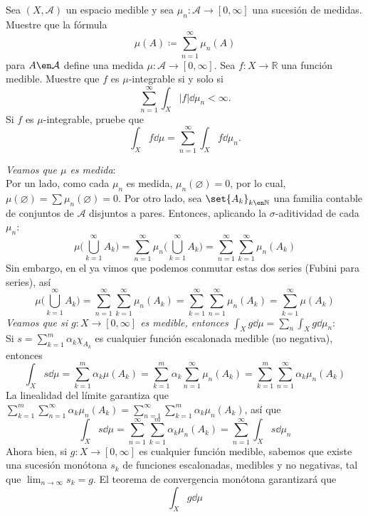 \setcounter{neje}{61}
\begin{nejer}[Repetido]
Sea $(X, \mathcal{A})$ un espacio medible y sea $\mu_n\colon \mathcal{A} \to [0, \infty]$ una sucesión de medidas. Muestre que la fórmula
$$
\mu(A) \coloneq \sum_{n=1}^{\infty} \mu_n(A)
$$
para $A \en \mathcal{A}$ define una medida $\mu\colon \mathcal{A} \to [0, \infty]$. Sea $f\colon X \to \mathbb{R}$ una función medible. Muestre que $f$ es $\mu$-integrable si y solo si
$$
\sum_{n=1}^{\infty} \int_X |f| \dd{\mu_n} < \infty.
$$
Si $f$ es $\mu$-integrable, pruebe que
$$
\int_X f \dd{\mu} = \sum_{n=1}^{\infty} \int_X f \dd{\mu_n}.
$$
\end{nejer}
\begin{sol}
\emph{Veamos que $\mu$ es medida}:\\
Por un lado, como cada $\mu_n$ es medida, $\mu_n(\varnothing) = 0$, por lo cual, $\mu(\varnothing) = \sum\mu_n(\varnothing) = 0$. Por otro lado, sea $\set{A_k}_{k\en\mathbb{N}}$ una familia contable de conjuntos de $\mathcal{A}$ disjuntos a pares. Entonces, aplicando la $\sigma$-aditividad de cada $\mu_n$:
\[
\mu\biggl( \bigcup^\infty_{k=1} A_k\biggr)
= \sum^\infty_{n=1}\mu_n\biggl( \bigcup^\infty_{k=1} A_k\biggr)
= \sum^\infty_{n=1}\sum^\infty_{k=1} \mu_n(A_k)
\]
Sin embargo, en el  ya vimos que podemos conmutar estas dos series (Fubini para series), así
\[
\mu\biggl( \bigcup^\infty_{k=1} A_k\biggr)
= \sum^\infty_{n=1}\sum^\infty_{k=1} \mu_n(A_k)
= \sum^\infty_{k=1}\sum^\infty_{n=1} \mu_n(A_k)
= \sum^\infty_{k=1} \mu(A_k)
\]
\emph{Veamos que si $g\colon X \to [0,\infty]$ es medible, entonces $\int_X g\dd{\mu} = \sum_n\int_X g \dd{\mu_n}$}:\\
Si $s = \sum^{m}_{k=1} \alpha_k \chi_{A_k}$ es cualquier función escalonada medible (no negativa), entonces
\[
\int_X s \dd{\mu}
= \sum^m_{k=1} \alpha_k\mu(A_k) 
= \sum^m_{k=1} \alpha_k \sum^\infty_{n=1} \mu_n(A_k)
= \sum^m_{k=1} \sum^\infty_{n=1} \alpha_k\mu_n(A_k)
\] 
La linealidad del límite garantiza que $\sum^m_{k=1}\sum^\infty_{n=1} \alpha_k\mu_n(A_k) = \sum^\infty_{n=1}\sum^m_{k=1}\alpha_k\mu_n(A_k)$, así que
\[
\int_X s \dd{\mu}
= \sum^\infty_{n=1}\sum^m_{k=1}\alpha_k\mu_n(A_k)
= \sum^\infty_{n=1} \int_X s \dd{\mu_n}
\]
Ahora bien, si $g \colon X \to [0,\infty]$ es cualquier función medible, sabemos que existe una sucesión monótona $s_k$ de funciones escalonadas, medibles y no negativas, tal que $\lim_{n\to\infty}s_k = g$. El teorema de convergencia monótona garantizará que
\begin{equation}\label{eq:convmon}
\int_X g \dd{\mu} 

\end{equation}
\end{sol}

